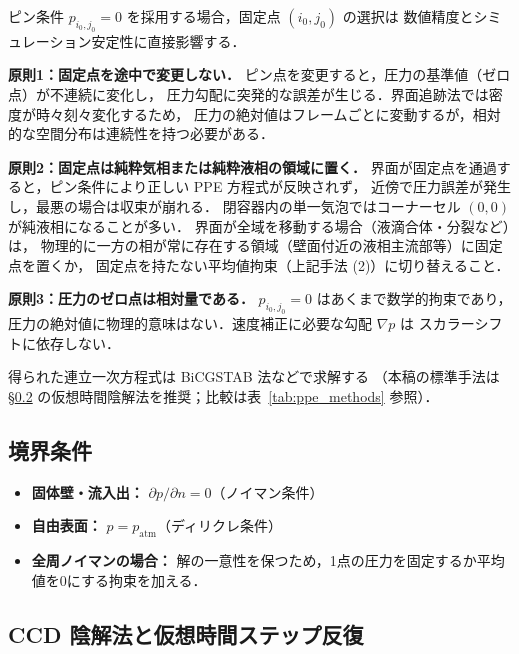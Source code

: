 ピン条件 $p_{i_0,j_0} = 0$ を採用する場合，固定点 $(i_0,j_0)$ の選択は
数値精度とシミュレーション安定性に直接影響する．

\noindent\textbf{原則1：固定点を途中で変更しない．}
ピン点を変更すると，圧力の基準値（ゼロ点）が不連続に変化し，
圧力勾配に突発的な誤差が生じる．界面追跡法では密度が時々刻々変化するため，
圧力の絶対値はフレームごとに変動するが，相対的な空間分布は連続性を持つ必要がある．

\noindent\textbf{原則2：固定点は純粋気相または純粋液相の領域に置く．}
界面が固定点を通過すると，ピン条件により正しい PPE 方程式が反映されず，
近傍で圧力誤差が発生し，最悪の場合は収束が崩れる．
閉容器内の単一気泡ではコーナーセル $(0,0)$ が純液相になることが多い．
界面が全域を移動する場合（液滴合体・分裂など）は，
物理的に一方の相が常に存在する領域（壁面付近の液相主流部等）に固定点を置くか，
固定点を持たない平均値拘束（上記手法 (2)）に切り替えること．

\noindent\textbf{原則3：圧力のゼロ点は相対量である．}
$p_{i_0,j_0} = 0$ はあくまで数学的拘束であり，
圧力の絶対値に物理的意味はない．速度補正に必要な勾配 $\nabla p$ は
スカラーシフトに依存しない．

得られた連立一次方程式は BiCGSTAB 法などで求解する
（本稿の標準手法は §\ref{sec:ppe_pseudotime} の仮想時間陰解法を推奨；比較は表~\ref{tab:ppe_methods} 参照）．

\subsection{境界条件}
\begin{itemize}
    \item \textbf{固体壁・流入出：} $\partial p/\partial n = 0$（ノイマン条件）
    \item \textbf{自由表面：} $p = p_{\mathrm{atm}}$（ディリクレ条件）
    \item \textbf{全周ノイマンの場合：} 解の一意性を保つため，1点の圧力を固定するか平均値を0にする拘束を加える．
\end{itemize}

\subsection{CCD 陰解法と仮想時間ステップ反復}
\label{sec:ppe_pseudotime}

